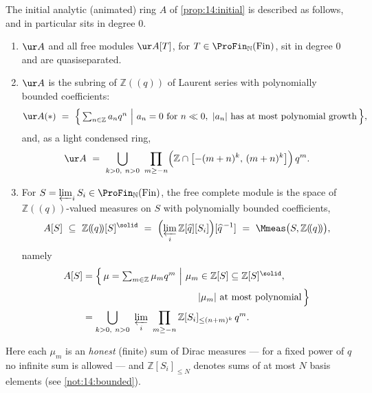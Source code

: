 \begin{theorem}
\label{thm:14:gaseous-base}
The initial analytic (animated) ring $A$ of \cref{prop:14:initial} is described as
follows, and in particular sits in degree $0$.
\begin{enumerate}
\item $\ur A$ and all free modules $\ur A[T]$, for $T\in\ProFin_{\mathbb{N}}(\mathrm{Fin})$,
sit in degree $0$ and are quasiseparated.
\item $\ur A$ is the subring of $\mathbb{Z}(\!(q)\!)$ of Laurent series with
polynomially bounded coefficients:
\begin{equation}
\label{eq:14:A-underlying}
\ur A(\ast)\ =\ \Bigl\{\,\textstyle\sum_{n\in\mathbb{Z}} a_n q^n\ \Big|\ a_n=0\ \text{for}\ n\ll 0,\ |a_n|\ \text{has at most polynomial growth}\,\Bigr\},
\end{equation}
and, as a light condensed ring,
\begin{equation*}
\ur A\ =\ \bigcup_{k>0,\ n>0}\ \prod_{m\ge -n}\Bigl(\mathbb{Z}\cap\bigl[-(m+n)^{k},\,(m+n)^{k}\bigr]\Bigr)\,q^{m}.
\end{equation*}
\item For $S=\varprojlim_i S_i\in\ProFin_{\mathbb{N}}(\mathrm{Fin})$, the free
complete module is the space of $\mathbb{Z}((q))$-valued measures on $S$ with
polynomially bounded coefficients,
\begin{equation*}
A[S]\ \subseteq\ \mathbb{Z}(\!(q)\!)[S]^{\solid}\ =\ \Bigl(\varprojlim_i\mathbb{Z}[\widehat{q}][S_i]\Bigr)[\widehat{q}^{\,-1}]\ =\ \Mmeas\bigl(S,\mathbb{Z}(\!(q)\!)\bigr),
\end{equation*}
namely
\begin{equation*}
\begin{aligned}
A[S]&=\Bigl\{\,\mu=\textstyle\sum_{m\in\mathbb{Z}}\mu_m q^m\ \Big|\
\mu_m\in\mathbb{Z}[S]\subseteq\mathbb{Z}[S]^{\solid},\\
&\hspace{12em}|\mu_m|\ \text{at most polynomial}\,\Bigr\}\\
&=\bigcup_{k>0,\ n>0}\ \varprojlim_i\ \prod_{m\ge -n}
\mathbb{Z}[S_i]_{\le (n+m)^{k}}\,q^{m}.
\end{aligned}
\end{equation*}
\end{enumerate}
Here each $\mu_m$ is an \emph{honest} (finite) sum of Dirac measures --- for a fixed
power of $q$ no infinite sum is allowed --- and $\mathbb{Z}[S_i]_{\le N}$ denotes
sums of at most $N$ basis elements (see \cref{not:14:bounded}).
\end{theorem}


